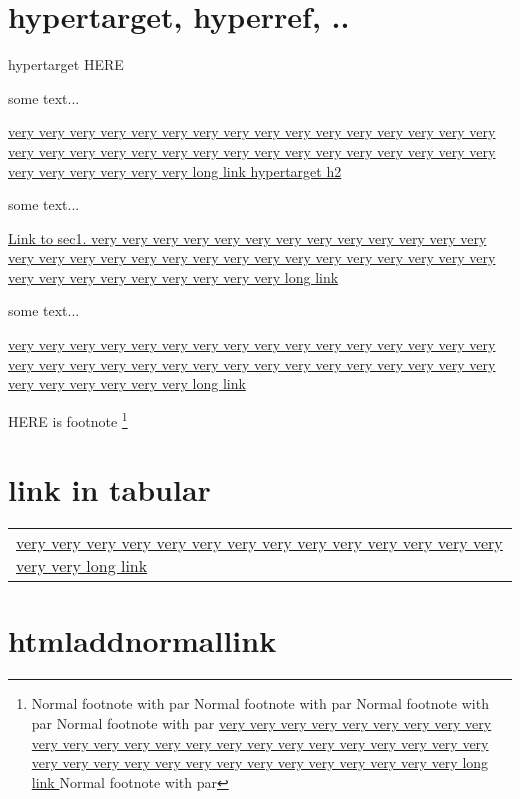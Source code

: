 \documentclass{article}
\begin{document}
\section{hypertarget, hyperref, .. }
\label{sec1}

\hypertarget{h2}{hypertarget HERE}

some text...

\hyperlink{h2}{%
very very very very very very 
very very very very very very very very very very 
very very very very very very very very very very very very 
very very very very very very very very very very long link hypertarget h2}

some text...

\hyperref[sec1]{Link to sec1. very very very very very very 
very very very very very very very very very very 
very very very very very very very very very very very very 
very very very very very very very very very very long link}

some text...

\href{www.texthref.lt}{very very very very very very 
very very very very very very very very very very 
very very very very very very very very very very very very 
very very very very very very very very very very long link
} 

HERE is footnote \footnote{Normal footnote with par 
Normal footnote with par 
Normal footnote with par 
Normal footnote with par
\href{www.footnotebreak.lt}{very very very very very very 
very very very very very very very very very very 
very very very very very very very very very very very very 
very very very very very very very very very very long link
} 
Normal footnote with par}

\section{link in tabular}
\begin{tabular*}{5cm}{|p{4cm}|}
\href{www.tabularbreak.lt}{very very very very very very 
very very very very very very very very very very long link
} 
\end{tabular*}

\section{htmladdnormallink}
\end{document}
